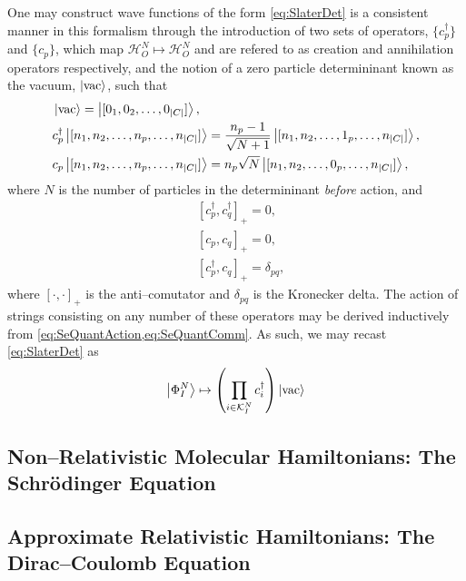 One may construct wave functions of the form \cref{eq:SlaterDet} is a consistent manner in this formalism through
the introduction of two sets of operators, $\{ c_p^\dagger \}$ and $\{ c_p \}$, which map $\mathcal{H}^N_O \mapsto \mathcal{H}^N_O$ 
and are refered to as creation and annihilation operators respectively, and the notion of a zero particle determininant known as 
the vacuum, $\left\vert \mathrm{vac} \right\rangle$, such that
\begin{subequations}
  \label{eq:SeQuantAction}
\begin{align}
  &\left\vert \mathrm{vac} \right\rangle = \left\vert [0_1, 0_2, \ldots, 0_{\vert C \vert}] \right\rangle, \\
  &c_p^\dagger \left\vert [n_1, n_2, \ldots, n_p, \ldots, n_{\vert C \vert}] \right\rangle = \frac{n_p-1}{\sqrt{N+1}} \left\vert [n_1, n_2, \ldots, 1_p, \ldots, n_{\vert C \vert}] \right\rangle,\\
  &c_p \left\vert [n_1, n_2, \ldots, n_p, \ldots, n_{\vert C \vert}] \right\rangle = {n_p}{\sqrt{N}} \left\vert [n_1, n_2, \ldots, 0_p, \ldots, n_{\vert C \vert}] \right\rangle,
\end{align}
\end{subequations}
where $N$ is the number of particles in the determininant \emph{before} action, and
\begin{subequations}
  \label{eq:SeQuantComm}
\begin{align}
  &[c_p^\dagger, c_q^\dagger]_+ = 0,\\
  &[c_p, c_q]_+ = 0,\\
  &[c_p^\dagger, c_q]_+ = \delta_{pq},
\end{align}
\end{subequations}
where $[\cdot,\cdot]_+$ is the anti--comutator and $\delta_{pq}$ is the Kronecker delta. The action of strings consisting on any number of these 
operators may be derived inductively from \cref{eq:SeQuantAction,eq:SeQuantComm}. As such, we may recast \cref{eq:SlaterDet} as
\begin{equation}
  \left\vert \Phi^N_I \right\rangle \mapsto \left(\prod_{i \in \mathcal{K}^N_I} c_i^\dagger\right) \left\vert \mathrm{vac} \right\rangle
\end{equation}

\subsection{Non--Relativistic Molecular Hamiltonians: The Schr\"{o}dinger Equation}
\label{sec:NRH}

\subsection{Approximate Relativistic Hamiltonians: The Dirac--Coulomb Equation}
\label{sec:RELH}




